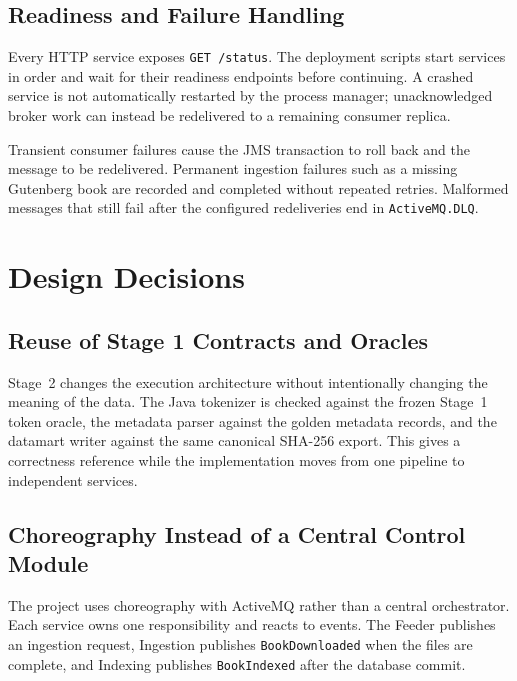 \documentclass[12pt,a4paper]{article}
\begin{document}
\subsection{Readiness and Failure Handling}

Every HTTP service exposes \texttt{GET /status}. The deployment scripts start services in order and
wait for their readiness endpoints before continuing. A crashed service is not automatically
restarted by the process manager; unacknowledged broker work can instead be redelivered to a
remaining consumer replica.

Transient consumer failures cause the JMS transaction to roll back and the message to be
redelivered. Permanent ingestion failures such as a missing Gutenberg book are recorded and
completed without repeated retries. Malformed messages that still fail after the configured
redeliveries end in \texttt{ActiveMQ.DLQ}.


\section{Design Decisions}
\label{sec:design}
\subsection{Reuse of Stage 1 Contracts and Oracles}

Stage~2 changes the execution architecture without intentionally changing the meaning of the data.
The Java tokenizer is checked against the frozen Stage~1 token oracle, the metadata parser against
the golden metadata records, and the datamart writer against the same canonical SHA-256 export.
This gives a correctness reference while the implementation moves from one pipeline to independent
services.

\subsection{Choreography Instead of a Central Control Module}

The project uses choreography with ActiveMQ rather than a central orchestrator. Each service owns
one responsibility and reacts to events. The Feeder publishes an ingestion request, Ingestion
publishes \texttt{BookDownloaded} when the files are complete, and Indexing publishes
\texttt{BookIndexed} after the database commit.
\end{document}
